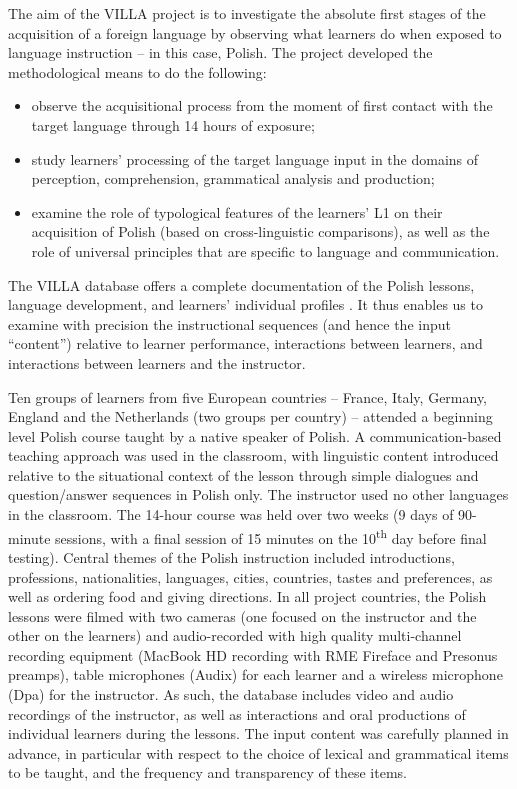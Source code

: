 \documentclass[output=paper,colorlinks,citecolor=brown,modfonts,nonflat]{../langscibook}
\begin{document}
The aim of the VILLA project is to investigate the absolute first stages of the acquisition of a foreign language by observing what learners do when exposed to language instruction – in this case, Polish. The project developed the methodological means to do the following:

\begin{itemize}
    \item observe the acquisitional process from the moment of first contact with the target language through 14 hours of exposure;
    \item study learners’ processing of the target language input in the domains of perception, comprehension, grammatical analysis and production;
    \item examine the role of typological features of the learners’ L1 on their acquisition of Polish (based on cross-linguistic comparisons), as well as the role of universal principles that are specific to language and communication.
\end{itemize}

The VILLA database offers a complete documentation of the Polish lessons, language development, and learners’ individual profiles \citep{Durand2019}. It thus enables us to examine with precision the instructional sequences (and hence the input “content”) relative to learner performance, interactions between learners, and interactions between learners and the instructor.

Ten groups of learners from five European countries – France, Italy, Germany, England and the Netherlands (two groups per country) – attended a beginning level Polish course taught by a native speaker of Polish. A communication-based teaching approach was used in the classroom, with linguistic content introduced relative to the situational context of the lesson through simple dialogues and question/answer sequences in Polish only. The instructor used no other languages in the classroom. The 14-hour course was held over two weeks (9 days of 90-minute sessions, with a final session of 15 minutes on the 10\textsuperscript{th} day before final testing). Central themes of the Polish instruction included introductions, professions, nationalities, languages, cities, countries, tastes and preferences, as well as ordering food and giving directions. In all project countries, the Polish lessons were filmed with two cameras (one focused on the instructor and the other on the learners) and audio-recorded with high quality multi-channel recording equipment (Mac{B}ook HD recording with RME Fireface and Presonus preamps), table microphones (Audix) for each learner and a wireless microphone (Dpa) for the instructor. As such, the database includes video and audio recordings of the instructor, as well as interactions and oral productions of individual learners during the lessons. The input content was carefully planned in advance, in particular with respect to the choice of lexical and grammatical items to be taught, and the frequency and transparency of these items. 
\end{document}
